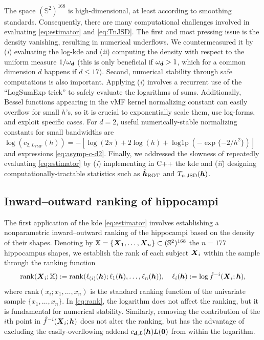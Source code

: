 \documentclass[oneside,11pt]{article}
\begin{document}
The space $(\mathbb{S}^2)^{168}$ is high-dimensional, at least according to smoothing standards. Consequently, there are many computational challenges involved in evaluating \eqref{eq:estimator} and \eqref{eq:TnJSD}. The first and most pressing issue is the density vanishing, resulting in numerical underflows. We countermeasured it  by (\textit{i}) evaluating the log-kde and (\textit{ii}) computing the density with respect to the uniform measure $1/\omega_{\boldsymbol{d}}$ %
%
(this is only beneficial if $\omega_{\boldsymbol{d}}>1$, which for a common dimension $d$ happens if $d\leq17$). Second, numerical stability through safe computations is also important. Applying (\textit{i}) involves a recurrent use of the ``LogSumExp trick'' to safely evaluate the logarithms of sums. Additionally, Bessel functions appearing in the vMF kernel normalizing constant can easily overflow for small $h$'s, so it is crucial to exponentially scale them, use log-forms, and exploit specific cases. For $d=2$, useful numerically-stable normalizing constants for small bandwidths are $\log(c_{2,L_{\mathrm{vMF}}}(h))=-[\log(2\pi)+2\log(h) + \operatorname{log1p}(-\exp\{-2/h^2\})]$ and expressions \eqref{eq:asymp-c-d2}. %
Finally, we addressed the slowness of repeatedly evaluating \eqref{eq:estimator} by (\textit{i}) implementing in C++ the kde and (\textit{ii}) designing computationally-tractable statistics such as $\hat{{\boldsymbol{h}}}_\mathrm{ROT}$ and $T_{n,\mathrm{JSD}}({\boldsymbol{h}})$.

\subsection{Inward--outward ranking of hippocampi}
\label{sec:inout}

The first application of the kde \eqref{eq:estimator} involves establishing a nonparametric inward--outward ranking of the hippocampi based on the density of their shapes. Denoting by $\mathbb{X}=\{\boldsymbol{X}_1,\ldots,\boldsymbol{X}_n\}\subset(\mathbb{S}^2)^{168}$ the $n=177$ hippocampus shapes, we establish the rank of each subject $\boldsymbol{X}_i$ within the sample through the ranking function
\begin{align}
    \mathrm{rank}(\boldsymbol{X}_i;\mathbb{X}):=\mathrm{rank}(\ell_{(i)}({\boldsymbol{h}});\ell_{1}({\boldsymbol{h}}),\ldots,\ell_{n}({\boldsymbol{h}})),\quad \ell_i({\boldsymbol{h}}):=\log \hat{f}^{-i}(\boldsymbol{X}_i;{\boldsymbol{h}}), \label{eq:rank}
\end{align}
where $\mathrm{rank}(x_i;x_1,\ldots,x_n)$ %
is the standard ranking function of the univariate sample $\{x_1,\ldots,\allowbreak x_n\}$. %
In \eqref{eq:rank}, the logarithm does not affect the ranking, but it is fundamental for numerical stability. Similarly, removing the contribution of the $i$th point in $\hat{f}^{-i}(\boldsymbol{X}_i;{\boldsymbol{h}})$ does not alter the ranking, but has the advantage of excluding the easily-overflowing addend $c_{\boldsymbol{d},L}({\boldsymbol{h}})L(\mathbf{0})$ from within the logarithm. %
\end{document}
